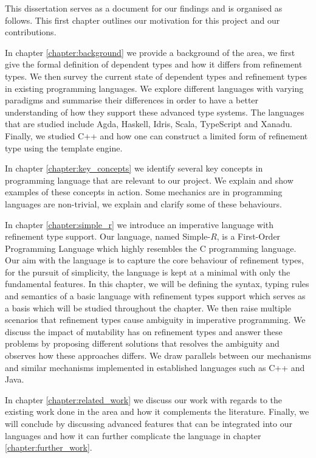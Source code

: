 \documentclass[a4paper,12pt]{report}
\begin{document}
\par
This dissertation serves as a document for our findings and is organised as 
follows. This first chapter outlines our motivation for this project and our 
contributions. 

\par
In chapter \ref{chapter:background} we provide a background of the area, we 
first give the formal definition of dependent types and how it differs 
from refinement types. We then survey the current state of 
dependent types and refinement types in existing programming languages. 
We explore different languages with varying paradigms and summarise their 
differences in order to have a better understanding of how they 
support these advanced type systems. The languages that are studied include 
Agda, Haskell, Idris, Scala, TypeScript and Xanadu. Finally, we studied 
C++ and how one can construct a limited form of refinement type using the 
template engine. 

\par
In chapter \ref{chapter:key_concepts} we identify several key concepts in 
programming language that are relevant to our project. We explain 
and show examples of these concepts in action. Some mechanics are in programming 
languages are non-trivial, we explain and clarify some of these behaviours.  

\par
In chapter \ref{chapter:simple_r} we introduce an imperative language with refinement type support. 
Our language, named Simple-$R$, is a First-Order Programming Language which 
highly resembles the C programming language. Our aim with the language is to 
capture the core behaviour of refinement types, for the pursuit 
of simplicity, the language is kept at a minimal with only the fundamental features. 
In this chapter, we will be defining the syntax, typing rules and semantics 
of a basic language with refinement types support which serves as a basis 
which will be studied throughout the chapter. We then raise 
multiple scenarios that refinement types cause ambiguity in imperative programming. 
We discuss the impact of mutability has on refinement types and 
answer these problems by proposing different solutions that resolves the 
ambiguity and observes how these approaches differs. We draw parallels between 
our mechanisms and similar mechanisms implemented in established languages such 
as C++ and Java. 

\par
In chapter \ref{chapter:related_work} we discuss our work with regards to the 
existing work done in the area and how it complements the literature.
Finally, we will conclude by discussing advanced features that can be integrated 
into our languages and how it can further complicate the language in chapter 
\ref{chapter:further_work}. 
\end{document}
